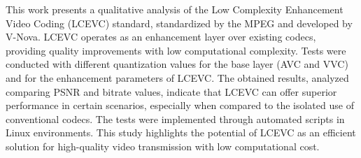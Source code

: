 This work presents a qualitative analysis of the Low Complexity Enhancement Video Coding 
(\acrfull{LCEVC}) standard, standardized by the \acrfull{MPEG} and developed by V-Nova. 
\acrshort{LCEVC} operates as an enhancement layer over existing codecs, providing quality 
improvements with low computational complexity. Tests were conducted with different 
quantization values for the base layer (\acrfull{AVC} and \acrfull{VVC}) and for the 
enhancement parameters of \acrshort{LCEVC}. The obtained results, analyzed comparing
\acrfull{PSNR} and bitrate values, indicate that \acrshort{LCEVC} can offer superior 
performance in certain scenarios, especially when compared to the isolated use of 
conventional codecs. The tests were implemented through automated scripts in Linux 
environments. This study highlights the potential of \acrshort{LCEVC} as an efficient 
solution for high-quality video transmission with low computational cost.
